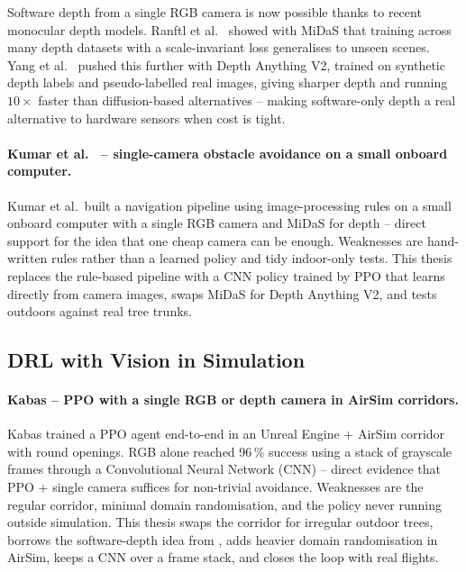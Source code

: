 \documentclass[../main.tex]{subfiles}
\begin{document}
Software depth from a single RGB camera is now possible thanks to recent monocular depth models. Ranftl et al.\ \cite{Ranftl2022} showed with MiDaS that training across many depth datasets with a scale-invariant loss generalises to unseen scenes. Yang et al.\ \cite{Yang2024DepthAnythingV2} pushed this further with Depth Anything V2, trained on synthetic depth labels and pseudo-labelled real images, giving sharper depth and running $10\times$ faster than diffusion-based alternatives -- making software-only depth a real alternative to hardware sensors when cost is tight.

\paragraph{Kumar et al.\ \cite{Kumar2023} -- single-camera obstacle avoidance on a small onboard computer.}
Kumar et al.\ built a navigation pipeline using image-processing rules on a small onboard computer with a single RGB camera and MiDaS for depth -- direct support for the idea that one cheap camera can be enough. Weaknesses are hand-written rules rather than a learned policy and tidy indoor-only tests. This thesis replaces the rule-based pipeline with a CNN policy trained by PPO that learns directly from camera images, swaps MiDaS for Depth Anything V2, and tests outdoors against real tree trunks.

\subsection{DRL with Vision in Simulation}

\paragraph{Kabas \cite{Kabas2022} -- PPO with a single RGB or depth camera in AirSim corridors.}
Kabas trained a PPO agent end-to-end in an Unreal Engine + AirSim corridor with round openings. RGB alone reached 96\,\% success using a stack of grayscale frames through a Convolutional Neural Network (CNN) -- direct evidence that PPO + single camera suffices for non-trivial avoidance. Weaknesses are the regular corridor, minimal domain randomisation, and the policy never running outside simulation. This thesis swaps the corridor for irregular outdoor trees, borrows the software-depth idea from \cite{Kumar2023}, adds heavier domain randomisation in AirSim, keeps a CNN over a frame stack, and closes the loop with real flights.
\end{document}
